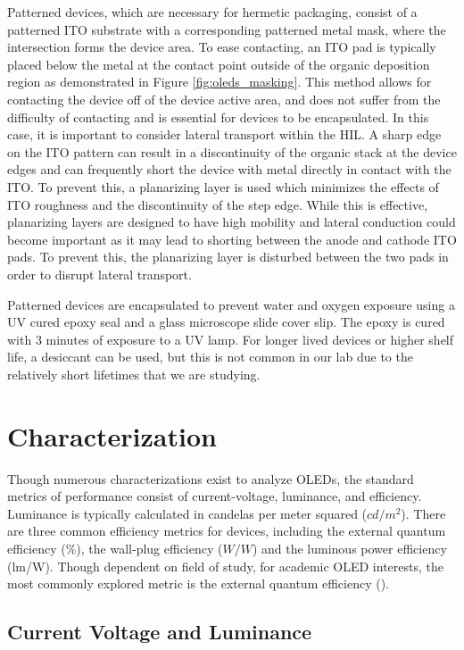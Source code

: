 \documentclass[../thesis.tex]{subfiles}
\begin{document}
Patterned devices, which are necessary for hermetic packaging, consist of a patterned ITO substrate with a corresponding patterned metal mask, where the intersection forms the device area.
To ease contacting, an ITO pad is typically placed below the metal at the contact point outside of the organic deposition region as demonstrated in Figure \ref{fig:oleds_masking}.
This method allows for contacting the device off of the device active area, and does not suffer from the difficulty of contacting and is essential for devices to be encapsulated.
In this case, it is important to consider lateral transport within the HIL.
A sharp edge on the ITO pattern can result in a discontinuity of the organic stack at the device edges and can frequently short the device with metal directly in contact with the ITO.
To prevent this, a planarizing layer is used which minimizes the effects of ITO roughness and the discontinuity of the step edge.
While this is effective, planarizing layers are designed to have high mobility and lateral conduction could become important as it may lead to shorting between the anode and cathode ITO pads.
To prevent this, the planarizing layer is disturbed between the two pads in order to disrupt lateral transport.

Patterned devices are encapsulated to prevent water and oxygen exposure using a UV cured epoxy seal and a glass microscope slide cover slip.
The epoxy is cured with 3 minutes of exposure to a UV lamp.
For longer lived devices or higher shelf life, a desiccant can be used, but this is not common in our lab due to the relatively short lifetimes that we are studying.


\section{Characterization}

Though numerous characterizations exist to analyze OLEDs, the standard metrics of performance consist of current-voltage, luminance, and efficiency.
Luminance is typically calculated in candelas per meter squared ($cd/m^2$).
There are three common efficiency metrics for devices, including the external quantum efficiency (\%), the wall-plug efficiency ($W/W$) and the luminous power efficiency (lm/W).
Though dependent on field of study, for academic OLED interests, the most commonly explored metric is the external quantum efficiency (\eqe).

\newpage

\subsection{Current Voltage and Luminance}
\end{document}
